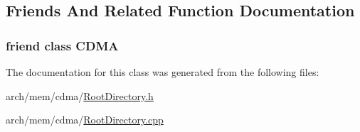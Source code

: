 \subsection{Friends And Related Function Documentation}
\hypertarget{class_simulator_1_1_c_d_m_a_1_1_root_directory_add415c7c29b0f2d422db4e084c6688e3}{
\subsubsection[{C\+D\+M\+A}]{\setlength{\rightskip}{0pt plus 5cm}friend class {\bf C\+D\+M\+A}\hspace{0.3cm}{\ttfamily [friend]}}}\label{class_simulator_1_1_c_d_m_a_1_1_root_directory_add415c7c29b0f2d422db4e084c6688e3}


The documentation for this class was generated from the following files\+:\begin{DoxyCompactItemize}
\item 
arch/mem/cdma/\hyperlink{cdma_2_root_directory_8h}{Root\+Directory.\+h}\item 
arch/mem/cdma/\hyperlink{cdma_2_root_directory_8cpp}{Root\+Directory.\+cpp}\end{DoxyCompactItemize}
